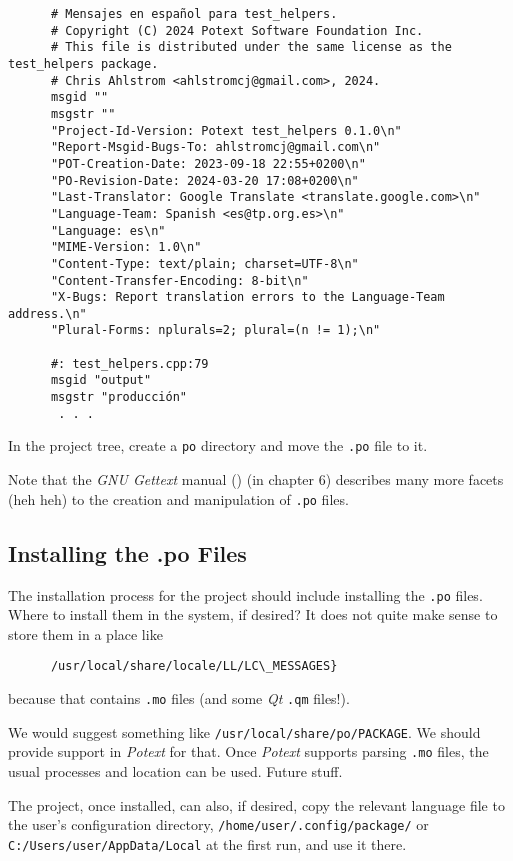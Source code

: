    \begin{verbatim}
      # Mensajes en español para test_helpers.
      # Copyright (C) 2024 Potext Software Foundation Inc.
      # This file is distributed under the same license as the test_helpers package.
      # Chris Ahlstrom <ahlstromcj@gmail.com>, 2024.
      msgid ""
      msgstr ""
      "Project-Id-Version: Potext test_helpers 0.1.0\n"
      "Report-Msgid-Bugs-To: ahlstromcj@gmail.com\n"
      "POT-Creation-Date: 2023-09-18 22:55+0200\n"
      "PO-Revision-Date: 2024-03-20 17:08+0200\n"
      "Last-Translator: Google Translate <translate.google.com>\n"
      "Language-Team: Spanish <es@tp.org.es>\n"
      "Language: es\n"
      "MIME-Version: 1.0\n"
      "Content-Type: text/plain; charset=UTF-8\n"
      "Content-Transfer-Encoding: 8-bit\n"
      "X-Bugs: Report translation errors to the Language-Team address.\n"
      "Plural-Forms: nplurals=2; plural=(n != 1);\n"

      #: test_helpers.cpp:79
      msgid "output"
      msgstr "producción"
       . . .
   \end{verbatim}

   In the project tree, create a \texttt{po} directory and move the
   \texttt{.po} file to it.

   Note that the \textsl{GNU Gettext} manual (\cite{gettextman}) (in chapter
   6) describes many more facets (heh heh) to the creation and manipulation
   of \texttt{.po} files.

\subsection{Installing the .po Files}
\label{subsubsec:potext_usage_installing_po_files}

   The installation process for the project should include installing the
   \texttt{.po} files.
   Where to install them in the system, if desired?
   It does not quite make sense to store them in a place like

   \begin{verbatim}
      /usr/local/share/locale/LL/LC\_MESSAGES}
   \end{verbatim}

   because that contains \texttt{.mo} files (and some \textsl{Qt}
   \texttt{.qm} files!).

   We would suggest something like
   \texttt{/usr/local/share/po/PACKAGE}.
   We should provide support in \textsl{Potext} for that.
   Once \textsl{Potext} supports parsing \texttt{.mo} files,
   the usual processes and location can be used.
   Future stuff.

   The project, once installed, can also, if desired, copy
   the relevant language file to the user's configuration directory,
   \texttt{/home/user/.config/package/} or
   \texttt{C:/Users/user/AppData/Local} at the first run, and use it
   there.

